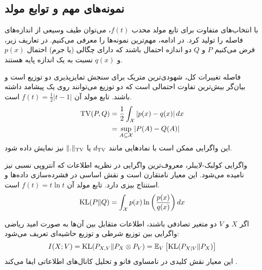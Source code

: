 \subsection{نمونه‌های مهم و توابع مولد}
\label{sec:bg:f-div-examples}

با انتخاب‌های متفاوت برای تابع مولد محدب $f(t)$، می‌توان طیف وسیعی از اندازه‌های فاصله را تولید کرد. در ادامه، مهم‌ترین نمونه‌ها را معرفی می‌کنیم.
در تعاریف زیر، فرض می‌کنیم $P$ و $Q$ دو اندازه احتمال باشند که دارای چگالی (یا جرم) احتمال $p(x)$ و $q(x)$ نسبت به یک اندازه پایه هستند.


\begin{تعریف}[تغییرات کل]
\label{def:tv}

فاصله تغییرات کل،
 شهودی‌ترین متریک برای سنجش تمایزپذیری دو توزیع است و بیان‌گر بیش‌ترین تفاوت احتمالی است که دو توزیع می‌توانند روی یک پیشامد داشته باشند.
تابع مولد آن $f(t) = \frac{1}{2}|t-1|$ است.
\begin{align}
\TV(P, Q) &= \frac{1}{2} \int_{\Xset} \left|p(x) - q(x)\right| dx \\
&= \sup_{A \subseteq \Xset} \left|P(A) - Q(A)\right|
\end{align}
این واگرایی ممکن است با نمادهایی مانند $d_{\operatorname*{TV}}$ یا $\|.\|_{\operatorname*{TV}}$ نیز نمایش داده ‌شود.
\end{تعریف}

\begin{تعریف}
\label{def:kl}
واگرایی کولبک-لایبلر،
معروف‌ترین واگرایی در نظریه اطلاعات که آنتروپی نسبی نیز نامیده می‌شود. این معیار نامتقارن است و نقش اساسی در فشرده‌سازی داده‌ها و استنتاج بیزی دارد. تابع مولد آن $f(t) = t \ln t$ است.
\begin{equation}
\label{eq:kl-def}
\KL(P \| Q) = \int_{\Xset} p(x) \ln \left(\frac{p(x)}{q(x)}\right) dx
\end{equation}
\end{تعریف}

\begin{تعریف}
\label{def:mutual-info}
اگر $X$ و $V$ دو متغیر تصادفی باشند، اطلاعات متقابل بین آن‌ها به صورت امید ریاضی واگرایی  بین توزیع شرطی و توزیع حاشیه‌ای تعریف می‌شود:
\begin{equation}
\label{eq:mutual-info}
I(X; V) = \KL(P_{X,V} \| P_X \otimes P_V) = \Eset_{V} \left[ \KL(P_{X|V} \| P_X) \right]
\end{equation}
این معیار نقش کلیدی در نامساوی فانو و تحلیل کانال‌های اطلاعاتی ایفا می‌کند \cite{duchi2018}.
\end{تعریف}

